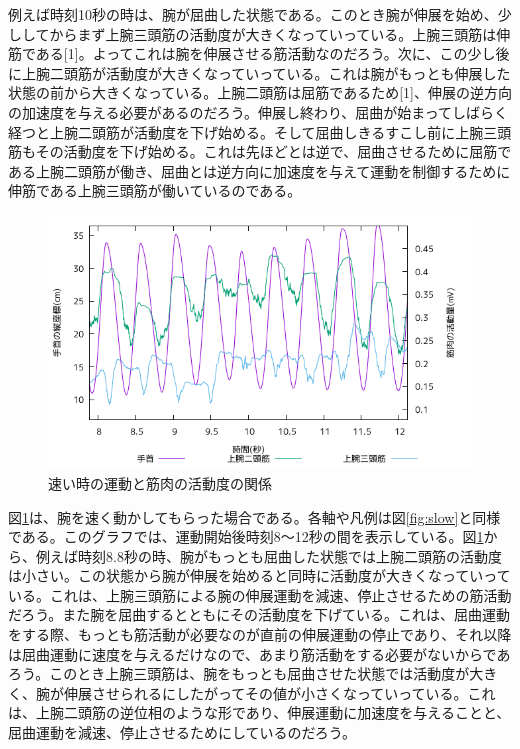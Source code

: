 \documentclass{jsarticle}
\begin{document}
例えば時刻10秒の時は、腕が屈曲した状態である。このとき腕が伸展を始め、少ししてからまず上腕三頭筋の活動度が大きくなっていっている。上腕三頭筋は伸筋である[1]。よってこれは腕を伸展させる筋活動なのだろう。次に、この少し後に上腕二頭筋が活動度が大きくなっていっている。これは腕がもっとも伸展した状態の前から大きくなっている。上腕二頭筋は屈筋であるため[1]、伸展の逆方向の加速度を与える必要があるのだろう。伸展し終わり、屈曲が始まってしばらく経つと上腕二頭筋が活動度を下げ始める。そして屈曲しきるすこし前に上腕三頭筋もその活動度を下げ始める。これは先ほどとは逆で、屈曲させるために屈筋である上腕二頭筋が働き、屈曲とは逆方向に加速度を与えて運動を制御するために伸筋である上腕三頭筋が働いているのである。

\begin{figure}[b]
  \begin{center}
    \includegraphics[width=15cm]{images/s2proto.png}
  \end{center}
  \caption{速い時の運動と筋肉の活動度の関係}
  \label{fig:fast}
\end{figure}
図\ref{fig:fast}は、腕を速く動かしてもらった場合である。各軸や凡例は図\ref{fig:slow}と同様である。このグラフでは、運動開始後時刻8〜12秒の間を表示している。図\ref{fig:fast}から、例えば時刻8.8秒の時、腕がもっとも屈曲した状態では上腕二頭筋の活動度は小さい。この状態から腕が伸展を始めると同時に活動度が大きくなっていっている。これは、上腕三頭筋による腕の伸展運動を減速、停止させるための筋活動だろう。また腕を屈曲するとともにその活動度を下げている。これは、屈曲運動をする際、もっとも筋活動が必要なのが直前の伸展運動の停止であり、それ以降は屈曲運動に速度を与えるだけなので、あまり筋活動をする必要がないからであろう。このとき上腕三頭筋は、腕をもっとも屈曲させた状態では活動度が大きく、腕が伸展させられるにしたがってその値が小さくなっていっている。これは、上腕二頭筋の逆位相のような形であり、伸展運動に加速度を与えることと、屈曲運動を減速、停止させるためにしているのだろう。
\end{document}

